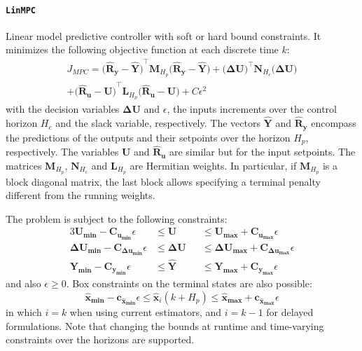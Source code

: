 \paragraph{\texttt{LinMPC}}
Linear model predictive controller with soft or hard bound constraints. It minimizes the following objective function at each discrete time $k$:
\begin{multline}\label{eq:J_MPC}
J_{\mathit{MPC}} = 
    \mathbf{\big(\hat{R}_y - \hat{Y}\big)}^\intercal \mathbf{M}_{H_p} \mathbf{\big(\hat{R}_y - \hat{Y}\big)}   
    + \mathbf{\big(ΔU\big)}^\intercal \mathbf{N}_{H_c} \mathbf{\big(ΔU\big)} \\
    + \mathbf{\big(\hat{R}_u - U\big)}^\intercal \mathbf{L}_{H_p} \mathbf{\big(\hat{R}_u - U\big)} 
    + C \epsilon^2
\end{multline}
with the decision variables $\mathbf{ΔU}$ and $\epsilon$, the inputs increments over the control horizon $H_c$ and the slack variable, respectively. The vectors $\mathbf{\hat{Y}}$ and $\mathbf{\hat{R}_y}$ encompass the predictions of the outputs and their setpoints over the horizon $H_p$, respectively. The variables $\mathbf{U}$ and $\mathbf{\hat{R}_u}$ are similar but for the input setpoints. The matrices $\mathbf{M}_{H_p}$, $\mathbf{N}_{H_c}$ and $\mathbf{L}_{H_p}$ are Hermitian weights. In particular, if $\mathbf{M}_{H_p}$ is a block diagonal matrix, the last block allows specifying a terminal penalty different from the running weights.

The problem is subject to the following constraints:
\begin{alignat}{3}
    \mathbf{U_{min}  - C_{u_{min}}}  \epsilon &\le \mathbf{U}  &&\le \mathbf{U_{max}  + C_{u_{max}}}  \epsilon \\
    \mathbf{ΔU_{min} - C_{Δu_{min}}} \epsilon &\le \mathbf{ΔU} &&\le \mathbf{ΔU_{max} + C_{Δu_{max}}} \epsilon \\
    \mathbf{Y_{min}  - C_{y_{min}}}  \epsilon &\le \mathbf{\hat{Y}} &&\le \mathbf{Y_{max}  + C_{y_{max}}}  \epsilon
\end{alignat}
and also $\epsilon \ge 0$. Box constraints on the terminal states are also possible: 
\begin{equation}
\mathbf{\hat{x}_{min}} {-} \mathbf{c_{\hat{x}_{min}}}\epsilon \le \mathbf{\hat{x}}_{i}(k{+}H_p) \le \mathbf{\hat{x}_{max}} + \mathbf{c_{\hat{x}_{max}}}\epsilon
\end{equation}
in which $i=k$ when using current estimators, and $i=k-1$ for delayed formulations. Note that changing the bounds at runtime and time-varying constraints over the horizons are supported.

